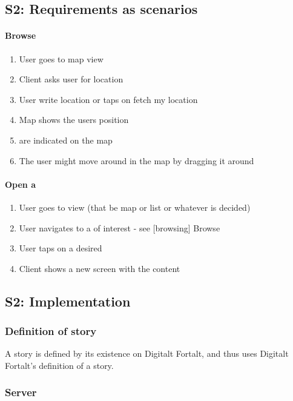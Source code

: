 \documentclass[11pt]{book}
\begin{document}
\subsection{S2: Requirements as scenarios}
\paragraph{Browse \wallentityp}
\begin{enumerate}
    \item User goes to map view
    \item Client asks user for location
    \item User write location or taps on fetch my location
    \item Map shows the users position
    \item \wallentitypcap are indicated on the map
    \item The user might move around in the map by dragging it around
\end{enumerate}

\paragraph{Open a \wallentitys}
\begin{enumerate}
    \item User goes to \wallentityp view (that be map or list or whatever is decided)
    \item User navigates to a \wallentitys of interest - see [\wallentitys browsing] Browse \wallentityp
    \item User taps on a desired \wallentitys
    \item Client shows a new screen with the \wallentitys content
\end{enumerate}

\subsection{S2: Implementation}

\subsubsection{Definition of story}
A story is defined by its existence on Digitalt Fortalt, and thus uses Digitalt Fortalt's definition of a story.

\subsubsection{Server}
\end{document}
